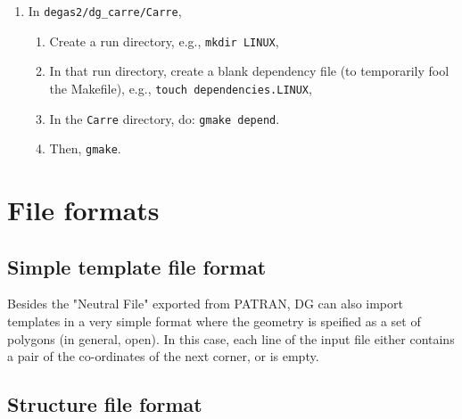 \documentclass[12pt]{report}
\begin{document}
\begin{enumerate}
\begin{enumerate}
        \item Create a run directory, e.g., \verb+mkdir LINUX+,
        \item In that run directory, create a blank dependency file (to 
          temporarily fool the Makefile), e.g., \verb+touch dependencies+,
        \item In the equtrn directory, do: \verb+gmake depend+.
        \item This will create \verb+.f+ (and perhaps \verb+.dbg+) 
files in the \verb+equtrn+ directory.  
These are not needed after this step and can be deleted.
        \item Then, \verb+gmake+.
        \item These routines are used to translate equilibrium data files from 
          one format to another (see Sec.~\ref{equtrn}).
   \end{enumerate}
   \item In \verb+degas2/dg_carre/Carre+,
   \begin{enumerate}
        \item Create a run directory, e.g., \verb+mkdir LINUX+,
        \item In that run directory, create a blank dependency file (to 
          temporarily fool the Makefile), e.g., 
\verb+touch dependencies.LINUX+,
        \item In the \verb+Carre+ directory, do: \verb+gmake depend+.
        \item Then, \verb+gmake+.
   \end{enumerate}
\end{enumerate}



\chapter{File formats}

\section{Simple template file format}

Besides the "Neutral File" exported from PATRAN, DG can also import
templates in a very simple format where the geometry is speified as a
set of polygons (in general, open). In this case, each line of the
input file either contains a pair of the co-ordinates of the next
corner, or is empty. 

\section{Structure file format}
\end{document}
